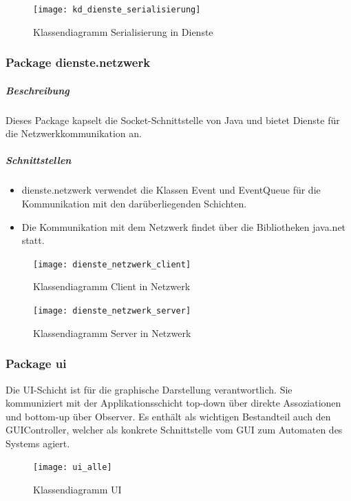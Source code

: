 \documentclass[12pt,halfparskip]{scrartcl}
\begin{document}
\begin{figure}[h]
	\centering
	\texttt{[image: kd\_dienste\_serialisierung]}
	\caption{Klassendiagramm Serialisierung in Dienste}
	\label{fig:kd_dienste_serialisierung}
\end{figure}

\clearpage
\subsubsection{Package dienste.netzwerk}
\label{ssub:package_dienste_netzwerk}
\subparagraph{Beschreibung}
Dieses Package kapselt die Socket-Schnittstelle von Java und bietet Dienste für die Netzwerkkommunikation an.

\subparagraph{Schnittstellen}
\begin{itemize}
	\item dienste.netzwerk verwendet die Klassen Event und EventQueue für die Kommunikation mit den darüberliegenden Schichten.
	\item Die Kommunikation mit dem Netzwerk findet über die Bibliotheken java.net statt.
\end{itemize}

\begin{figure}[h]
	\centering
	\texttt{[image: dienste\_netzwerk\_client]}
	\caption{Klassendiagramm Client in Netzwerk}
	\label{fig:dienste_netzwerk_client}
\end{figure}

\begin{figure}[h]
	\centering
	\texttt{[image: dienste\_netzwerk\_server]}
	\caption{Klassendiagramm Server in Netzwerk}
	\label{fig:dienste_netzwerk_server}
\end{figure}

\clearpage
\subsubsection{Package ui}
\label{ssub:package_ui}
Die UI-Schicht ist für die graphische Darstellung verantwortlich. Sie kommuniziert mit der Applikationsschicht top-down über direkte Assoziationen und bottom-up über Observer. Es enthält als wichtigen Bestandteil auch den GUIController, welcher als konkrete Schnittstelle vom GUI zum Automaten des Systems agiert.

\begin{figure}[h]
	\centering
	\texttt{[image: ui\_alle]}
	\caption{Klassendiagramm UI}
	\label{fig:ui_alle}
\end{figure}
\end{document}
